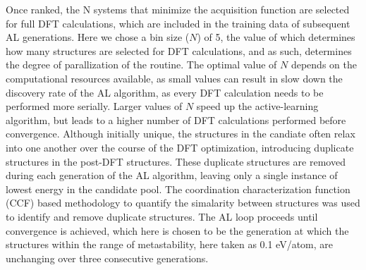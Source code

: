 Once ranked, the N systems that minimize the acquisition function are selected for full DFT calculations, which are included in the training data of subsequent AL generations.
%
Here we chose a bin size ($N$) of \num{5}, the value of which determines how many structures are selected for DFT calculations,
and as such, determines the degree of parallization of the routine.
%
The optimal value of $N$ depends on the computational resources available, as small values can result in slow down the discovery rate of the AL algorithm,
as every DFT calculation needs to be performed more serially.
%
Larger values of $N$ speed up the active-learning algorithm, but leads to a higher number of DFT calculations performed before convergence.
%
Although initially unique, the structures in the candiate often relax into one another over the course of the DFT optimization, introducing duplicate structures in the post-DFT structures.
%
These duplicate structures are removed during each generation of the AL algorithm, leaving only a single instance of lowest energy in the candidate pool.
%
The coordination characterization function (CCF) based methodology to quantify the simalarity between structures was used to identify and remove duplicate structures.\cite{Su2017}
%
The AL loop proceeds until convergence is achieved, which here is chosen to be the generation at which the structures within the range of metastability, here taken as \num{0.1} eV/atom, are unchanging over three consecutive generations.



